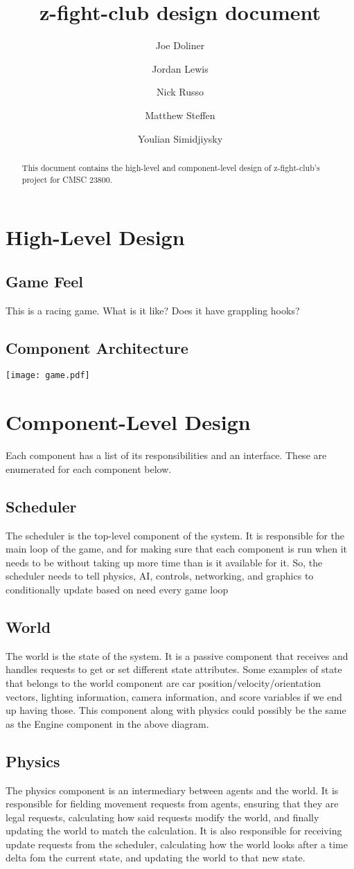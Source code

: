 \documentclass[12pt]{article}
\title{z-fight-club design document}
\author{Joe Doliner \and Jordan Lewis \and Nick Russo \and Matthew Steffen \and Youlian Simidjiysky}
\begin{document}
 \maketitle
\begin{abstract}
This document contains the high-level and component-level design of
z-fight-club's project for CMSC 23800.
\end{abstract}
\section{High-Level Design}
\subsection{Game Feel}
This is a racing game. What is it like? Does it have grappling hooks?
\subsection{Component Architecture}
\texttt{[image: game.pdf]}

\section{Component-Level Design}
Each component has a list of its responsibilities and an interface. These are
enumerated for each component below.
\subsection{Scheduler}
The scheduler is the top-level component of the system. It is responsible for
the main loop of the game, and for making sure that each component is run
when it needs to be without taking up more time than is it available for it.
So, the scheduler needs to tell physics, AI, controls, networking, and graphics
to conditionally update based on need every game loop
\subsection{World}
The world is the state of the system. It is a passive component that receives
and handles requests to get or set different state attributes. Some examples
of state that belongs to the world component are car
position/velocity/orientation vectors, lighting information, camera information,
and score variables if we end up having those. This component along with physics
could possibly be the same as the Engine component in the above diagram.
\subsection{Physics}
The physics component is an intermediary between agents and the world. It is
responsible for fielding movement requests from agents, ensuring that they are
legal requests, calculating how said requests modify the world, and finally
updating the world to match the calculation. It is also responsible for
receiving update requests from the scheduler, calculating how the world looks
after a time delta fom the current state, and updating the world to that new
state.
\end{document}
